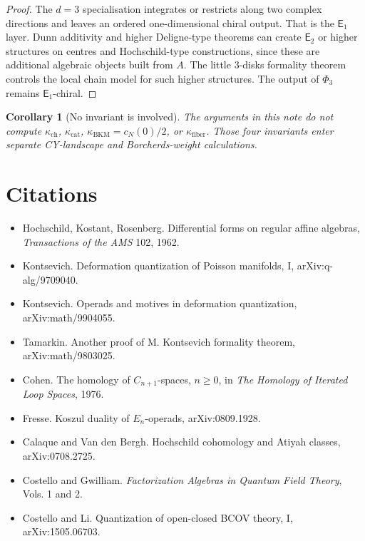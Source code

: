 \documentclass[11pt]{amsart}
\newtheorem{corollary}[theorem]{Corollary}
\theoremstyle{definition}
\theoremstyle{remark}
\providecommand{\Eone}{\mathsf{E}_1}
\providecommand{\Etwo}{\mathsf{E}_2}
\begin{document}
\begin{proof}
The \(d=3\) specialisation integrates or restricts along two complex
directions and leaves an ordered one-dimensional chiral output.  That
is the \(\Eone\) layer.  Dunn additivity and higher Deligne-type
theorems can create \(\Etwo\) or higher structures on centres and
Hochschild-type constructions, since these are additional algebraic
objects built from \(A\).  The little \(3\)-disks formality theorem
controls the local chain model for such higher structures.  The output
of \(\Phi_3\) remains \(\Eone\)-chiral.
\end{proof}

\begin{corollary}[No invariant is involved]
\label{cor:no-invariants}
The arguments in this note do not compute
\(\kappa_{\mathrm{ch}}\), \(\kappa_{\mathrm{cat}}\),
\(\kappa_{\mathrm{BKM}}=c_N(0)/2\), or
\(\kappa_{\mathrm{fiber}}\).  Those four invariants enter separate
CY-landscape and Borcherds-weight calculations.
\end{corollary}

\section{Citations}
\label{sec:citations}

\begin{itemize}
\item Hochschild, Kostant, Rosenberg.  Differential forms on regular
affine algebras, \emph{Transactions of the AMS} 102, 1962.
\item Kontsevich.  Deformation quantization of Poisson manifolds, I,
arXiv:q-alg/9709040.
\item Kontsevich.  Operads and motives in deformation quantization,
arXiv:math/9904055.
\item Tamarkin.  Another proof of M. Kontsevich formality theorem,
arXiv:math/9803025.
\item Cohen.  The homology of \(C_{n+1}\)-spaces, \(n\geq 0\), in
\emph{The Homology of Iterated Loop Spaces}, 1976.
\item Fresse.  Koszul duality of \(E_n\)-operads, arXiv:0809.1928.
\item Calaque and Van den Bergh.  Hochschild cohomology and Atiyah
classes, arXiv:0708.2725.
\item Costello and Gwilliam.  \emph{Factorization Algebras in Quantum
Field Theory}, Vols. 1 and 2.
\item Costello and Li.  Quantization of open-closed BCOV theory, I,
arXiv:1505.06703.
\end{itemize}
\end{document}
